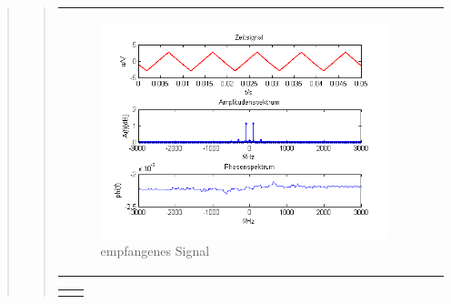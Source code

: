 \begin{quote}
\begin{quote}
\begin{center}
\begin{tabular}{ll}
            \begin{minipage}{0.6\textwidth}
                \begin{figure}[H]
                    \label{fig:DemodreieckmT2}
                    \includegraphics[scale=0.7]{Bilder/Demo_Dre_2k_100Hz_mo_mitTiefpass}
                    \caption{empfangenes Signal}
                \end{figure}
        
            \end{minipage}
        
        \end{tabular}
        \end{center}
        
        \begin{center}
        \begin{tabular}{ll}
        
        \hspace{-5cm}
            \begin{minipage}{0.6\textwidth}
                

\end{minipage}
\end{tabular}
\end{center}
\end{quote}
\end{quote}
